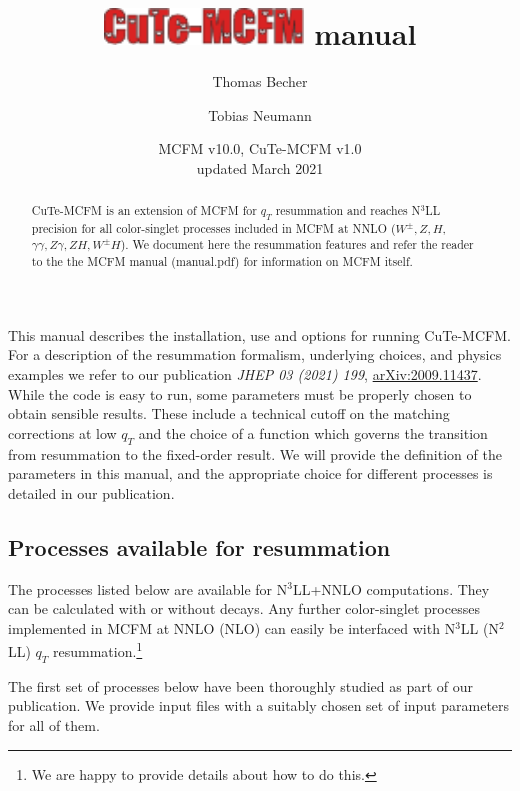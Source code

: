 \documentclass[
  11pt]{scrartcl}
\author[1]{Thomas Becher}
\author[2]{Tobias Neumann}
\affil[1]{Universität Bern, \url{becher@itp.unibe.ch}}
\affil[2]{Brookhaven National Laboratory, \url{tneumann@bnl.gov}}
\title{\includegraphics[width=2.08333in,height=\textheight]{figs/logo.pdf}
manual}
\date{MCFM v10.0, CuTe-MCFM v1.0 \\ updated March 2021}
\begin{document}
\maketitle
\begin{abstract}
CuTe-MCFM is an extension of MCFM for $q_T$ resummation and reaches N$^3$LL precision for all color-singlet processes included in MCFM at NNLO  ($W^\pm, Z, H$, $\gamma\gamma, Z\gamma, ZH, W^\pm H$). We document here the resummation features and refer the reader to the the MCFM manual (manual.pdf) for information on MCFM itself.
\end{abstract}

\tableofcontents

\hrulefill

This manual describes the installation, use and options for running CuTe-MCFM.
For a description of the resummation formalism, underlying choices, and
physics examples we refer to our publication \textit{JHEP 03 (2021) 199},
\href{https://arxiv.org/abs/2009.11437}{arXiv:2009.11437}. While the code is
easy to run, some parameters must be properly chosen to obtain sensible results. These include a technical cutoff on the matching corrections at low $q_T$ and the choice of a function which governs the transition from resummation to the fixed-order result. We will provide the definition of the parameters in this manual, and the appropriate choice for different processes is detailed in our publication.

\hypertarget{processes-available-for-resummation}{%
\subsection{Processes available for
resummation}\label{processes-available-for-resummation}}


The processes listed below are available for
N\(^3\)LL+NNLO computations. They can be calculated with or without decays.
Any further color-singlet processes implemented in MCFM at NNLO (NLO)
can easily be interfaced with N\(^3\)LL (N\(^2\)LL) \(q_T\)
resummation.\footnote{We are happy to provide
    details about how to do this.}

The first set of processes below have been thoroughly studied as part of our
publication. We provide input files with a suitably chosen set of input
parameters for all of them.
\end{document}
